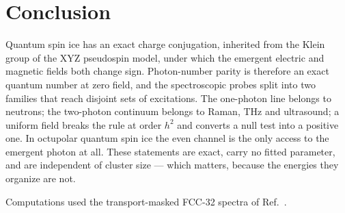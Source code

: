 \documentclass[aps,prl,preprint,amsmath,amssymb,superscriptaddress,
longbibliography,floatfix]{revtex4-2}
\begin{document}
\section{Conclusion}

Quantum spin ice has an exact charge conjugation, inherited from the Klein
group of the XYZ pseudospin model, under which the emergent electric and
magnetic fields both change sign.  Photon-number parity is therefore an exact
quantum number at zero field, and the spectroscopic probes split into two
families that reach disjoint sets of excitations.  The one-photon line belongs
to neutrons; the two-photon continuum belongs to Raman, THz and ultrasound; a
uniform field breaks the rule at order $h^2$ and converts a null test into a
positive one.  In octupolar quantum spin ice the even channel is the only
access to the emergent photon at all.  These statements are exact, carry no
fitted parameter, and are independent of cluster size --- which matters,
because the energies they organize are not.

\begin{acknowledgments}
Computations used the transport-masked FCC-32 spectra of
Ref.~\cite{ZhouKimMask}.
\end{acknowledgments}



\end{document}
